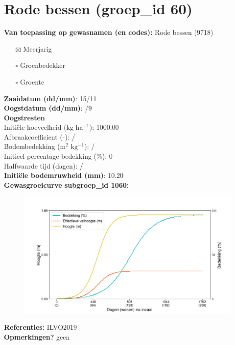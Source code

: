 \documentclass{article}
\begin{document}
 \section{Rode bessen (groep\_id 60)} 
 \textbf{Van toepassing op gewasnamen (en codes):} Rode bessen (9718) 
 \begin{multicols}{3} \begin{itemize} \item[$\boxtimes$] Meerjarig \item[$\square$] Groenbedekker \item[$\square$] Groente \end{itemize} \end{multicols} 
  \textbf{Zaaidatum (dd/mm)}: 15/11  \vspace{0.10cm} \\ 
  \textbf{Oogstdatum (dd/mm)}: /9  \vspace{0.10cm} \\ 
  \textbf{Oogstresten} \vspace{0.05cm} \\ 
  \tab Initi\"{e}le hoeveelheid (kg ha$^{-1}$): 1000.00 \vspace{0.05cm} \\ 
  \tab Afbraakcoefficient (-): / \vspace{0.05cm} \\ 
  \tab Bodembedekking (m$^2$ kg$^{-1}$): / \vspace{0.05cm} \\ 
  \tab Initieel percentage bedekking (\%): 0 \vspace{0.05cm} \\ 
  \tab Halfwaarde tijd (dagen): / \vspace{0.05cm} \\ 
  \textbf{Initi\"{e}le bodemruwheid (mm)}: 10.20 \vspace{0.05cm} \\ 
  \textbf{Gewasgroeicurve subgroep\_id 1060:} 
 \begin{center} \begin{figure}[H] \includegraphics[width=12.5cm]{temp/1060.png} \end{figure} \end{center} 
  \textbf{Referenties:} ILVO2019 \vspace{0.10cm} \\ 
  \textbf{Opmerkingen?} geen \vspace{0.10cm} \\ 
 \newpage 
\end{document}
